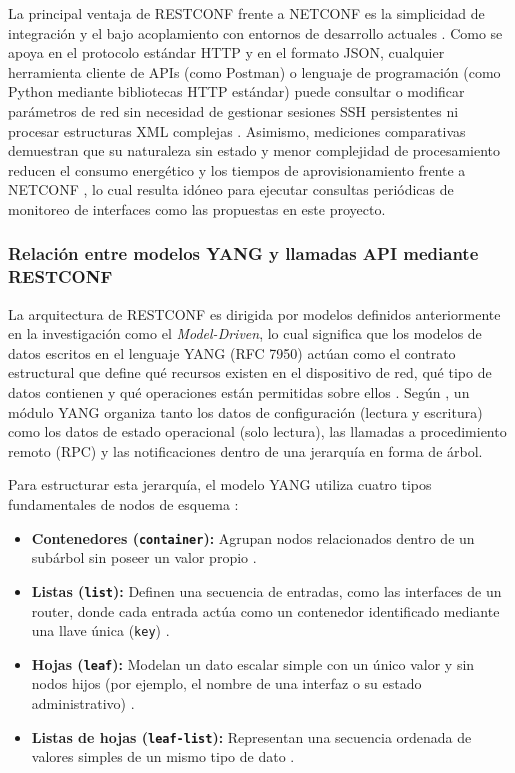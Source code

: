\documentclass[12pt,a4paper]{article}
\begin{document}
La principal ventaja de RESTCONF frente a NETCONF es la simplicidad de integración y el bajo acoplamiento con entornos de desarrollo actuales \parencite{cisco_devnet, granderath2023}. Como se apoya en el protocolo estándar HTTP y en el formato JSON, cualquier herramienta cliente de APIs (como Postman) o lenguaje de programación (como Python mediante bibliotecas HTTP estándar) puede consultar o modificar parámetros de red sin necesidad de gestionar sesiones SSH persistentes ni procesar estructuras XML complejas \parencite{cisco_devnet, granderath2023}. Asimismo, mediciones comparativas demuestran que su naturaleza sin estado y menor complejidad de procesamiento reducen el consumo energético y los tiempos de aprovisionamiento frente a NETCONF \parencite{bhat2023}, lo cual resulta idóneo para ejecutar consultas periódicas de monitoreo de interfaces como las propuestas en este proyecto.

\subsubsection{Relación entre modelos YANG y llamadas API mediante RESTCONF}

La arquitectura de RESTCONF es dirigida por modelos definidos anteriormente en la investigación como el \textit{Model-Driven}, lo cual significa que los modelos de datos escritos en el lenguaje YANG (RFC 7950) actúan como el contrato estructural que define qué recursos existen en el dispositivo de red, qué tipo de datos contienen y qué operaciones están permitidas sobre ellos \parencite{cisco_restconf, granderath2023}. Según \textcite{bhat2023}, un módulo YANG organiza tanto los datos de configuración (lectura y escritura) como los datos de estado operacional (solo lectura), las llamadas a procedimiento remoto (RPC) y las notificaciones dentro de una jerarquía en forma de árbol.

Para estructurar esta jerarquía, el modelo YANG utiliza cuatro tipos fundamentales de nodos de esquema \parencite{granderath2023}:

\begin{itemize}
    \item \textbf{Contenedores (\texttt{container}):} Agrupan nodos relacionados dentro de un subárbol sin poseer un valor propio \parencite{granderath2023}.
    \item \textbf{Listas (\texttt{list}):} Definen una secuencia de entradas, como las interfaces de un router, donde cada entrada actúa como un contenedor identificado mediante una llave única (\texttt{key}) \parencite{granderath2023}.
    \item \textbf{Hojas (\texttt{leaf}):} Modelan un dato escalar simple con un único valor y sin nodos hijos (por ejemplo, el nombre de una interfaz o su estado administrativo) \parencite{granderath2023}.
    \item \textbf{Listas de hojas (\texttt{leaf-list}):} Representan una secuencia ordenada de valores simples de un mismo tipo de dato \parencite{granderath2023}.
\end{itemize}
\end{document}
